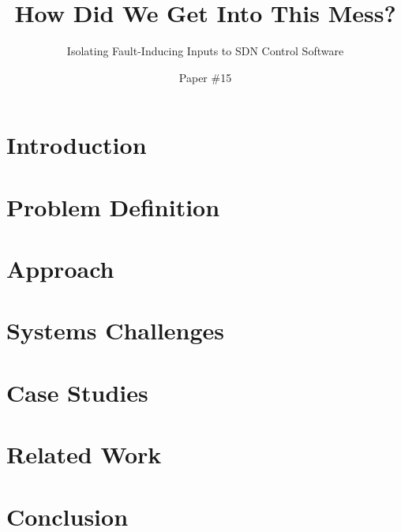 \documentclass{sig-alt-hotnets}
\begin{document}
    \date{}

\title{How Did We Get Into This Mess?}
\subtitle{Isolating Fault-Inducing Inputs to SDN Control Software}

\author{Paper \#15}

\date{}
    \maketitle
    \thispagestyle{empty}

\abstract{{\it }}

\section{Introduction}
\label{sec:intro}


\section{Problem Definition}
\label{sec:formalism}


\section{Approach}
\label{sec:approach}


\section{Systems Challenges}
\label{sec:systems_challenges}


\section{Case Studies}
\label{sec:casestudies}


%

\section{Related Work}
\label{sec:related_work}


\section{Conclusion}
\label{sec:conclusion}


 \small 

%
\end{document}
